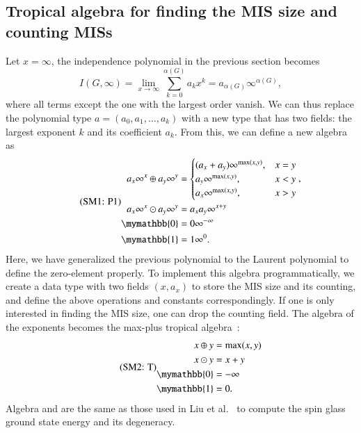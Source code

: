 \documentclass[review, onefignum, onetabnum]{siamart190516}
\begin{document}
\subsection{Tropical algebra for finding the MIS size and counting MISs}
Let $x=\infty$, the independence polynomial in the previous section becomes
\begin{equation}
I(G, \infty) = \lim_{x\rightarrow \infty}\sum_{k=0}^{\alpha(G)}a_k x^k = a_{\alpha(G)} \infty^{\alpha(G)},
\end{equation}
where all terms except the one with the largest order vanish. We can thus replace the polynomial type $a = (a_0, a_1, \ldots, a_k)$ with a new type that has two fields: the largest exponent $k$ and its coefficient $a_k$.
From this, we can define a new algebra as
\begin{equation}
    \eqname{P1}
\begin{split}
    a_x\infty^x \oplus a_y\infty^y &= \begin{cases}
        (a_x + a_y)\infty^{\max(x,y)}, & x = y\\
        a_y\infty^{\max(x,y)}, & x < y\\
        a_x\infty^{\max(x,y)}, & x > y
    \end{cases}, \\
    a_x\infty^x \odot a_y\infty^y &= a_x a_y\infty^{x+y}\\
    \mymathbb{0} &= 0\infty^{-\infty}\\
    \mymathbb{1} &= 1\infty^{0}.
\end{split}%
\label{eq:countingtropical}
\end{equation}
Here, we have generalized the previous polynomial to the Laurent polynomial to define the zero-element properly.
To implement this algebra programmatically, we create a data type with two fields $(x, a_x)$ to store the MIS size and its counting,
and define the above operations and constants correspondingly.
If one is only interested in finding the MIS size, one can drop the counting field.
The algebra of the exponents becomes the max-plus tropical algebra~\cite{Maclagan2015, Moore2011}:
\begin{equation}\eqname{T}
    \begin{split}
        x \oplus y &= \max(x,y)\\
        x \odot y &= x + y\\
        \mymathbb{0} &= -\infty\\
        \mymathbb{1} &= 0.
    \end{split}\label{eq:tropical}
\end{equation}
Algebra  and  are the same as those used in Liu et al.~\cite{Liu2021} to compute the spin glass ground state energy and its degeneracy.
\end{document}
